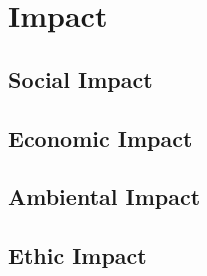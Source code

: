 \chapter{Impact} \label{chap:impact}


\section{Social Impact} \label{sec:social_impact}

\section{Economic Impact} \label{sec:economic_impact}

\section{Ambiental Impact} \label{sec:amb_impact}

\section{Ethic Impact} \label{sec:ethic_impact}
